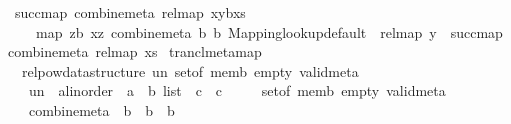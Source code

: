 \begin{isabellebody}
{\isacharbar}{\kern0pt}\ {\isachardoublequoteopen}succ{\isacharunderscore}{\kern0pt}map\ combine{\isacharunderscore}{\kern0pt}meta\ rel{\isacharunderscore}{\kern0pt}map\ {\isacharparenleft}{\kern0pt}{\isacharparenleft}{\kern0pt}{\isacharparenleft}{\kern0pt}x{\isacharcomma}{\kern0pt}y{\isacharparenright}{\kern0pt}{\isacharcomma}{\kern0pt}b{\isacharparenright}{\kern0pt}{\isacharhash}{\kern0pt}xs{\isacharparenright}{\kern0pt}\ {\isacharequal}{\kern0pt}\ \isanewline
\ \ \ \ map\ {\isacharparenleft}{\kern0pt}{\isasymlambda}{\isacharparenleft}{\kern0pt}z{\isacharcomma}{\kern0pt}b{\isacharprime}{\kern0pt}{\isacharparenright}{\kern0pt}{\isachardot}{\kern0pt}\ {\isacharparenleft}{\kern0pt}{\isacharparenleft}{\kern0pt}x{\isacharcomma}{\kern0pt}z{\isacharparenright}{\kern0pt}{\isacharcomma}{\kern0pt}\ combine{\isacharunderscore}{\kern0pt}meta\ b\ b{\isacharprime}{\kern0pt}{\isacharparenright}{\kern0pt}{\isacharparenright}{\kern0pt}\ {\isacharparenleft}{\kern0pt}Mapping{\isachardot}{\kern0pt}lookup{\isacharunderscore}{\kern0pt}default\ {\isacharbrackleft}{\kern0pt}{\isacharbrackright}{\kern0pt}\ rel{\isacharunderscore}{\kern0pt}map\ y{\isacharparenright}{\kern0pt}\ {\isacharat}{\kern0pt}\ succ{\isacharunderscore}{\kern0pt}map\ combine{\isacharunderscore}{\kern0pt}meta\ rel{\isacharunderscore}{\kern0pt}map\ xs{\isachardoublequoteclose}\isanewline
\isanewline
{}\isamarkupfalse%
\ trancl{\isacharunderscore}{\kern0pt}meta{\isacharunderscore}{\kern0pt}map\ {\isacharequal}{\kern0pt}\isanewline
\ \ relpow{\isacharunderscore}{\kern0pt}data{\isacharunderscore}{\kern0pt}structure\ un\ set{\isacharunderscore}{\kern0pt}of\ memb\ empty\ valid{\isacharunderscore}{\kern0pt}meta\isanewline
\ \ \ un\ {\isacharcolon}{\kern0pt}{\isacharcolon}{\kern0pt}\ {\isachardoublequoteopen}{\isacharparenleft}{\kern0pt}{\isacharparenleft}{\kern0pt}{\isacharprime}{\kern0pt}a{\isacharcolon}{\kern0pt}{\isacharcolon}{\kern0pt}linorder\ {\isasymtimes}\ {\isacharprime}{\kern0pt}a{\isacharparenright}{\kern0pt}\ {\isasymtimes}\ {\isacharprime}{\kern0pt}b{\isacharparenright}{\kern0pt}\ list\ {\isasymRightarrow}\ {\isacharprime}{\kern0pt}c\ {\isasymRightarrow}\ {\isacharprime}{\kern0pt}c{\isachardoublequoteclose}\isanewline
\ \ \ \ \ set{\isacharunderscore}{\kern0pt}of\ memb\ empty\ valid{\isacharunderscore}{\kern0pt}meta\ {\isacharplus}{\kern0pt}\isanewline
\ \ \ combine{\isacharunderscore}{\kern0pt}meta\ {\isacharcolon}{\kern0pt}{\isacharcolon}{\kern0pt}\ {\isachardoublequoteopen}{\isacharprime}{\kern0pt}b\ {\isasymRightarrow}\ {\isacharprime}{\kern0pt}b\ {\isasymRightarrow}\ {\isacharprime}{\kern0pt}b{\isachardoublequoteclose}\isanewline

\end{isabellebody}

